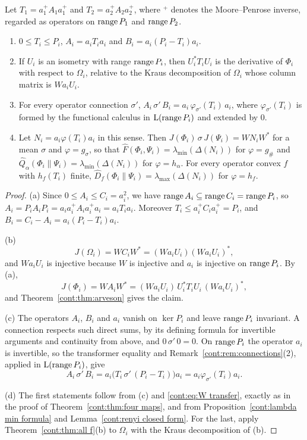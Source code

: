 \begin{lemma}\label{cont:lem:inpair general}
Let $T_1=a_1^+A_1a_1^+$ and $T_2=a_2^+A_2a_2^+$, where $^+$ denotes the Moore--Penrose inverse, regarded as operators on $\operatorname{range} P_1$ and $\operatorname{range} P_2$.
\begin{enumerate}
\item[(a)] $0\leq T_i\leq P_i$, $A_i=a_iT_ia_i$ and $B_i=a_i(P_i-T_i)a_i$.
\item[(b)] If $U_i$ is an isometry with range $\operatorname{range} P_i$, then $U_i^*T_iU_i$ is the derivative of $\Phi_i$ with respect to $\Omega_i$, relative to the Kraus decomposition of $\Omega_i$ whose column matrix is $Wa_iU_i$.
\item[(c)] For every operator connection $\sigma'$, $A_i\,\sigma'\,B_i=a_i\,\varphi_{\sigma'}(T_i)\,a_i$, where $\varphi_{\sigma'}(T_i)$ is formed by the functional calculus in $\mathrm{L}(\operatorname{range} P_i)$ and extended by $0$.
\item[(d)] Let $N_i=a_i\varphi(T_i)a_i$ in this sense. Then $J(\Phi_i)\,\sigma\,J(\Psi_i)=WN_iW^*$ for a mean $\sigma$ and $\varphi=g_\sigma$, so that $\widehat F(\Phi_i,\Psi_i)=\lambda_{\min}(\Delta(N_i))$ for $\varphi=g_\#$ and $\widehat Q_\alpha(\Phi_i\|\Psi_i)=\lambda_{\min}(\Delta(N_i))$ for $\varphi=h_\alpha$. For every operator convex $f$ with $h_f(T_i)$ finite, $\widehat D_f(\Phi_i\|\Psi_i)=\lambda_{\max}(\Delta(N_i))$ for $\varphi=h_f$.
\end{enumerate}
\end{lemma}

\begin{proof}
(a) Since $0\leq A_i\leq C_i=a_i^2$, we have $\operatorname{range} A_i\subseteq\operatorname{range} C_i=\operatorname{range} P_i$, so $A_i=P_iA_iP_i=a_ia_i^+A_ia_i^+a_i=a_iT_ia_i$. Moreover $T_i\leq a_i^+C_ia_i^+=P_i$, and $B_i=C_i-A_i=a_i(P_i-T_i)a_i$.

(b)
\[
J(\Omega_i)=WC_iW^*=(Wa_iU_i)(Wa_iU_i)^*,
\]
and $Wa_iU_i$ is injective because $W$ is injective and $a_i$ is injective on $\operatorname{range} P_i$. By (a),
\[
J(\Phi_i)=WA_iW^*=(Wa_iU_i)\,U_i^*T_iU_i\,(Wa_iU_i)^*,
\]
and Theorem~\ref{cont:thm:arveson} gives the claim.

(c) The operators $A_i$, $B_i$ and $a_i$ vanish on $\ker P_i$ and leave $\operatorname{range} P_i$ invariant. A connection respects such direct sums, by its defining formula for invertible arguments and continuity from above, and $0\,\sigma'\,0=0$. On $\operatorname{range} P_i$ the operator $a_i$ is invertible, so the transformer equality and Remark~\ref{cont:rem:connections}(2), applied in $\mathrm{L}(\operatorname{range} P_i)$, give
\[
A_i\,\sigma'\,B_i=a_i\big(T_i\,\sigma'\,(P_i-T_i)\big)a_i=a_i\varphi_{\sigma'}(T_i)a_i.
\]


(d) The first statements follow from (c) and \eqref{cont:eq:W transfer}, exactly as in the proof of Theorem~\ref{cont:thm:four maps}, and from Proposition~\ref{cont:lambda min formula} and Lemma~\ref{cont:renyi closed form}. For the last, apply Theorem~\ref{cont:thm:all f}(b) to $\Omega_i$ with the Kraus decomposition of (b).
\end{proof}

